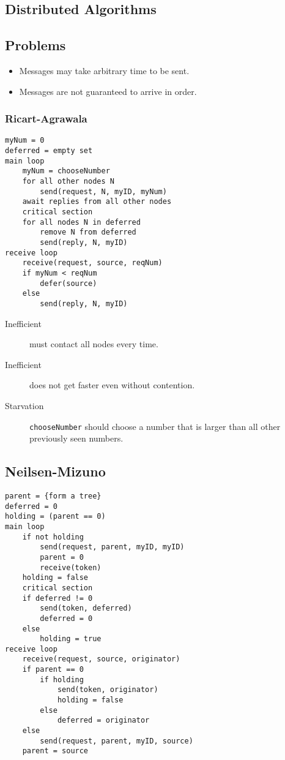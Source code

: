 \documentclass[landscape]{cheat}
\begin{document}
\begin{multicols*}{3}
\section{Distributed Algorithms}
\subsection{Problems}
\begin{itemize}
    \item Messages may take arbitrary time to be sent.
    \item Messages are not guaranteed to arrive in order.
\end{itemize}

\subsubsection{Ricart-Agrawala}
\begin{lstlisting}
myNum = 0
deferred = empty set
main loop
    myNum = chooseNumber
    for all other nodes N
        send(request, N, myID, myNum)
    await replies from all other nodes
    critical section
    for all nodes N in deferred
        remove N from deferred
        send(reply, N, myID)
receive loop
    receive(request, source, reqNum)
    if myNum < reqNum
        defer(source)
    else
        send(reply, N, myID)
\end{lstlisting}

\begin{description}
    \item[Inefficient] must contact all nodes every time.
    \item[Inefficient] does not get faster even without contention.
    \item[Starvation] \lstinline{chooseNumber} should choose a number that is larger than all other previously seen numbers.
\end{description}

\subsection{Neilsen-Mizuno}
\begin{lstlisting}
parent = {form a tree}
deferred = 0
holding = (parent == 0)
main loop
    if not holding
        send(request, parent, myID, myID)
        parent = 0
        receive(token)
    holding = false
    critical section
    if deferred != 0
        send(token, deferred)
        deferred = 0
    else
        holding = true
receive loop
    receive(request, source, originator)
    if parent == 0
        if holding
            send(token, originator)
            holding = false
        else
            deferred = originator
    else
        send(request, parent, myID, source)
    parent = source
\end{lstlisting}


\end{multicols*}
\end{document}
